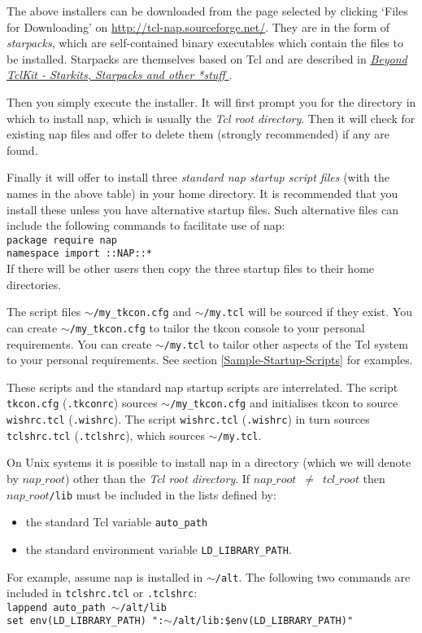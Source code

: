   \par The above installers can be downloaded from the page selected by clicking
 `Files for Downloading'  on
  \href{http://tcl-nap.sourceforge.net/}
  {http://tcl-nap.sourceforge.net/}.
They are in the form of 
  \emph{starpacks}, which are self-contained binary executables which
  contain the files to be installed. Starpacks are themselves based on
  Tcl and are described in 
  \href{http://www.equi4.com/papers/skpaper1.html}{ \emph{Beyond TclKit - Starkits, Starpacks and other *stuff} }.
  \par Then you simply execute the installer. It will first prompt you
  for the directory in which to install nap, which is usually the 
  \emph{Tcl root directory}. Then it will check for existing nap
  files and offer to delete them (strongly recommended) if any are
  found.
  \par Finally it will offer to install three 
  \emph{standard nap startup script files} (with the names in the
  above table) in your home directory. It is recommended that you
  install these unless you have alternative startup files. Such
  alternative files can include the following commands to facilitate
  use of nap: 
  \texttt{
  \\package require nap
  \\namespace import ::NAP::*}
  \\If there will be other users then copy the three startup files
  to their home directories.
  \par The script files 
  \texttt{$\sim$/my\_tkcon.cfg} and 
  \texttt{$\sim$/my.tcl} will be sourced if they exist. You can create 
  \texttt{$\sim$/my\_tkcon.cfg} to tailor the tkcon console to your
  personal requirements. You can create 
  \texttt{$\sim$/my.tcl} to tailor other aspects of the Tcl system to
  your personal requirements. See section
  \ref{Sample-Startup-Scripts}
for examples.
  \par These scripts and the standard nap startup scripts are
  interrelated. The script 
  \texttt{tkcon.cfg} (\texttt{.tkconrc}) sources 
  \texttt{$\sim$/my\_tkcon.cfg} and initialises tkcon to source 
  \texttt{wishrc.tcl} (\texttt{.wishrc}). The script 
  \texttt{wishrc.tcl} (\texttt{.wishrc}) in turn sources 
  \texttt{tclshrc.tcl} (\texttt{.tclshrc}), which sources 
  \texttt{$\sim$/my.tcl}.
  \par On Unix systems it is possible to install nap in a directory
  (which we will denote by 
  $nap\_root$) other than the 
  \emph{Tcl root directory}. If 
  $nap\_root$\ $\neq$\  
  $tcl\_root$ then 
  $nap\_root$\texttt{/lib} must be included in the lists defined by:
  \begin{itemize}
    \item the standard Tcl variable 
    \texttt{auto\_path}
    \item the standard environment variable 
    \texttt{LD\_LIBRARY\_PATH}.
  \end{itemize}For example, assume nap is installed in 
  \texttt{$\sim$/alt}. The following two commands are included in 
  \texttt{tclshrc.tcl} or 
  \texttt{.tclshrc}:
  \\
    \texttt{lappend auto\_path $\sim$/alt/lib
    \\set env(LD\_LIBRARY\_PATH)
    ":$\sim$/alt/lib:\$env(LD\_LIBRARY\_PATH)"}
